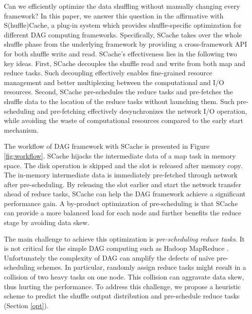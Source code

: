 Can we efficiently optimize the data shuffling without manually changing every framework?
In this paper, we answer this question in the affirmative with S(huffle)Cache, a plug-in system which provides shuffle-specific optimization for different DAG computing frameworks.
Specifically, SCache takes over the whole shuffle phase from the underlying framework by providing a cross-framework API for both shuffle write and read.
SCache's effectiveness lies in the following two key ideas.
First, SCache decouples the shuffle read and write from both map and reduce tasks.
Such decoupling effectively enables fine-grained resource management and better multiplexing between the computational and I/O resources.
Second,
SCache pre-schedules the reduce tasks and pre-fetches the shuffle data to the location of the reduce tasks without launching them.
Such pre-scheduling and pre-fetching effectively desynchronizes the network I/O operation, while avoiding the waste of computational resources compared to the early start mechanism.

The workflow of DAG framework with SCache is presented in Figure \ref{fig:workflow}. SCache hijacks the intermediate data of a map task in memory space. The disk operation is skipped and the slot is released after memory copy. The in-memory intermediate data is immediately pre-fetched through network after pre-scheduling. By releasing the slot earlier and start the network transfer ahead of reduce tasks, SCache can help the DAG framework achieve a significant performance gain. A by-product optimization of pre-scheduling is that SCache can provide a more balanced load for each node and further benefits the reduce stage by avoiding data skew.

The main challenge to achieve this optimization is \textit{pre-scheduling reduce tasks}. It is not critical for the simple DAG computing such as Hadoop MapReduce \cite{mapreduce}. Unfortunately the complexity of DAG can amplify the defects of na\"{i}ve pre-scheduling schemes. In particular, randomly assign reduce tasks might result in a collision of two heavy tasks on one node. This collision can aggravate data skew, thus hurting the performance. To address this challenge, we propose a heuristic scheme to predict the shuffle output distribution and pre-schedule reduce tasks (Section \ref{opt}).

